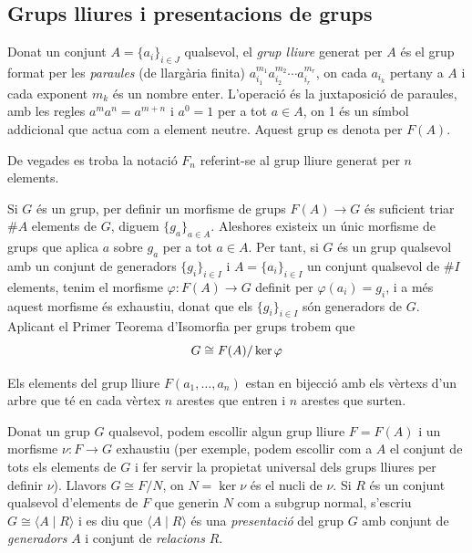 \documentclass[../main.tex]{subfiles}
\begin{document}
\subsection{Grups lliures i presentacions de grups}

\begin{defi}
\label{def:gruplliure} Donat un conjunt $A = \{a_i\}_{i\in J}$ qualsevol, el \textit{grup lliure} generat per $A$ és el grup format per les \textit{paraules} (de llargària finita) $a_{i_1}^{m_1}a_{i_2}^{m_2}\cdots a_{i_r}^{m_r}$, on cada $a_{i_k}$ pertany a $A$ i cada exponent $m_k$ és un nombre enter. L'operació és la juxtaposició de paraules, amb les regles $a^ma^n = a^{m+n}$ i $a^0=1$ per a tot $a\in A$, on 1 és un símbol addicional que actua com a element neutre. Aquest grup es denota per $F(A)$.
\end{defi}

\begin{nota}
De vegades es troba la notació $F_n$ referint-se al grup lliure generat per $n$ elements.
\end{nota}

\begin{nota}
\label{nota:gruplliureisomorfisme} Si $G$ és un grup, per definir un morfisme de grups $F(A)\rightarrow G$ és suficient triar $\#A$ elements de $G$, diguem $\{g_a\}_{a\in A}$. Aleshores existeix un únic morfisme de grups que aplica $a$ sobre $g_a$ per a tot $a\in A$. Per tant, si $G$ és un grup qualsevol amb un conjunt de generadors $\{g_i\}_{i\in I}$ i $A=\{a_i\}_{i\in I}$ un conjunt qualsevol de $\#I$ elements, tenim el morfisme $\varphi:F(A)\rightarrow G$ definit per $\varphi(a_i)=g_i$, i a més aquest morfisme és exhaustiu, donat que els $\{g_i\}_{i\in I}$ són generadors de $G$. Aplicant el Primer Teorema d'Isomorfia per grups trobem que
\begin{equation}
    \notag
    G\cong F(A)/\ker\varphi
\end{equation}
\end{nota} 

\begin{nota}
Els elements del grup lliure $F(a_1,\ldots,a_n)$ estan en bijecció amb els vèrtexs d'un arbre que té en cada vèrtex $n$ arestes que entren i $n$ arestes que surten.
\end{nota}

\begin{defi}
\label{def:presentaciogrup} Donat un grup $G$ qualsevol, podem escollir algun grup lliure $F = F(A)$ i un morfisme $\nu:F\rightarrow G$ exhaustiu (per exemple, podem escollir com a $A$ el conjunt de tots els elements de $G$ i fer servir la propietat universal dels grups lliures per definir $\nu$). Llavors $G\cong F/N$, on $N=\ker\nu$ és el nucli de $\nu$. Si $R$ és un conjunt qualsevol d'elements de $F$ que generin $N$ com a subgrup normal, s'escriu $G\cong \langle A\mid R\rangle$ i es diu que $\langle A\mid R\rangle$ és una \textit{presentació} del grup $G$ amb conjunt de \textit{generadors} $A$ i conjunt de \textit{relacions} $R$.
\end{defi}
\end{document}
